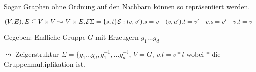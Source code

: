 \begin{beispiel}
    
    Sogar Graphen ohne Ordnung auf den Nachbarn können so repräsentiert werden.

    $(V, E), E \subseteq V \times V
    \\
    \leadsto V \times E, \mathcal{E}
    \\
    \Sigma = \{ s, t \}
    \\
    \mathcal{E}: (v, v').s = v
    \\ \quad  (v, u').t = v'
    \\ \quad  v.s = v'
    \\ \quad  v.t = v
    $

\end{beispiel}

\begin{beispiel}
    
    Gegeben: Endliche Gruppe $G$ mit Erzeugern $g_1 \dots g_d$

    $\leadsto$ Zeigerstruktur $\Sigma = \{ g_1 \dots g_d, g_1^{-1} ,\dots g_d^{-1}$, 
    $V = G$, 
    $v.l = v * l$ wobei $*$ die Gruppenmultiplikation ist.

\end{beispiel}




